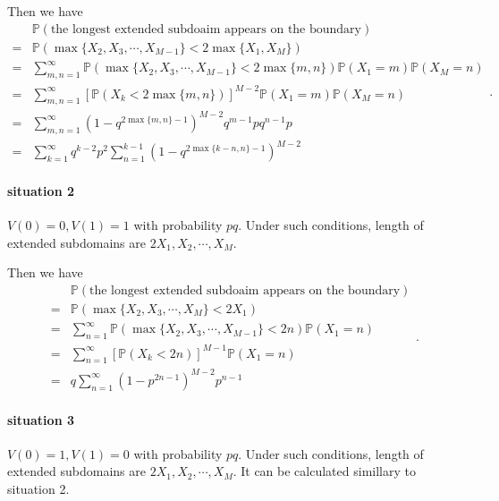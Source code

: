 \documentclass[a4paper,11pt]{article}
\begin{document}
\begin{appendices}
Then we have
\begin{equation*}
\begin{split}
  & \mathbb{P}(\text{the longest extended subdoaim appears on the boundary}) \\
= & \mathbb{P}(\max\{X_2, X_3, \cdots, X_{M-1}\} < 2 \max\{X_1, X_M\}) \\
= & \sum_{m,n=1}^{\infty} \mathbb{P}(\max\{X_2, X_3, \cdots, X_{M-1}\} < 2 \max\{m,  n\}) \mathbb{P}(X_1 = m) \mathbb{P}(X_M = n) \\
= & \sum_{m,n=1}^{\infty} [\mathbb{P}(X_k < 2 \max\{m,n\}) ]^{M-2} \mathbb{P}(X_1 = m) \mathbb{P}(X_M = n)\\
= & \sum_{m,n=1}^{\infty} (1 - q^{2 \max\{m,n\}-1})^{M-2} q^{m-1} p q^{n-1} p\\
= & \sum_{k=1}^{\infty} q^{k-2} p^2 \sum_{n=1}^{k-1} (1 - q^{2 \max\{k-n,n\}-1})^{M-2} 
\end{split}.
\end{equation*}

\paragraph*{situation 2}
$V(0) = 0, V(1) = 1$ with probability $p q$. Under such conditions, length of extended subdomains are $2 X_1, X_2, \cdots, X_M$.

Then we have
\begin{equation*}
\begin{split}
  & \mathbb{P}(\text{the longest extended subdoaim appears on the boundary}) \\
= & \mathbb{P}(\max\{X_2, X_3, \cdots, X_{M}\} < 2 X_1) \\
= & \sum_{n=1}^{\infty} \mathbb{P}(\max\{X_2, X_3, \cdots, X_{M-1}\} < 2 n) \mathbb{P}(X_1 = n) \\
= & \sum_{n=1}^{\infty} [\mathbb{P}(X_k < 2 n)]^{M-1} \mathbb{P}(X_1 = n)\\
= & q \sum_{n=1}^{\infty} (1 - p^{2 n-1})^{M-2} p^{n-1}
\end{split}.
\end{equation*}

\paragraph*{situation 3}
$V(0) = 1, V(1) = 0$ with probability $p q$. Under such conditions, length of extended subdomains are $2 X_1, X_2, \cdots, X_M$. It can be calculated simillary to situation 2.


\end{appendices}
\end{document}
